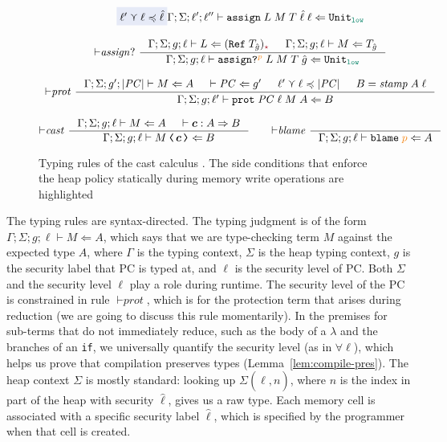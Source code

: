 \begin{figure}[tbp]
{\begin{gather*}
{               \highlightblue{\ell' \curlyvee \ell \preccurlyeq \hat{\ell}} }
              {\Gamma; \Sigma; \ell'; \ell'' \vdash \ccassign{L}{M}{T}{\hat{\ell}}{\ell} \Leftarrow \Unit_{\low}}
    \\[2ex]
    {\vdash}\mathit{assign?} ~
    \inference{\Gamma; \Sigma; g; \ell \vdash L \Leftarrow (\Refer{T_{\hat{g}}})_{\unk} &
               \Gamma; \Sigma; g; \ell \vdash M \Leftarrow T_{\hat{g}}}
              {\Gamma; \Sigma; g; \ell \vdash \ccassignproj{L}{M}{T}{\hat{g}}{p} \Leftarrow \Unit_{\low}}
    \\[2ex]
    {\vdash}\mathit{prot} ~
    \inference{\Gamma; \Sigma; g'; | \PC | \vdash M \Leftarrow A &
               \vdash \PC \Leftarrow g' &
               \ell' \curlyvee \ell \preccurlyeq | \PC | &
               B = \mathit{stamp} \; A \; \ell}
              {\Gamma; \Sigma; g; \ell' \vdash \ccprot{\PC}{\ell}{M}{A} \Leftarrow B}
    \\[2ex]
    {\vdash}\mathit{cast} ~
    \inference{\Gamma; \Sigma; g; \ell \vdash M \Leftarrow A & \vdash \bm{c} : A \Rightarrow B}
              {\Gamma; \Sigma; g; \ell \vdash \cccast{M}{\bm{c}} \Leftarrow B}
    \qquad
    {\vdash}\mathit{blame} ~
    \inference{}
              {\Gamma; \Sigma; g; \ell \vdash \blame{p} \Leftarrow A}
  \end{gather*}}
  \caption{Typing rules of the cast calculus \CC. The side conditions that enforce the
  heap policy statically during memory write operations are highlighted}
  \label{fig:cc-typing-full}
\end{figure}

The typing rules are syntax-directed.  The typing judgment is of the
form $\Gamma ; \Sigma ; g ; \ell \vdash M \Leftarrow A$, which says
that we are type-checking \CC term $M$ against the expected type $A$,
where $\Gamma$ is the typing context, $\Sigma$ is the heap typing
context, $g$ is the security label that PC is typed at, and $\ell$ is
the security level of PC.  Both $\Sigma$ and the security level $\ell$
play a role during runtime.  The security level of the PC is constrained in
rule ${\vdash}\textit{prot}$, which is for the protection term that
arises during reduction (we are going to discuss this rule momentarily).
In the premises for sub-terms that do not immediately
reduce, such as the body of a $\lambda$ and the branches of an
\texttt{if}, we universally quantify the security level (as in
$\forall \ell$), which helps us prove that
compilation preserves types (Lemma~\ref{lem:compile-pres}).  The heap
context $\Sigma$ is mostly standard: looking up
$\Sigma(\hat{\ell}, n)$, where $n$ is the index in part of the heap
with security $\hat{\ell}$, gives us a raw type. Each memory cell is
associated with a specific security label $\hat{\ell}$, which is
specified by the programmer when that cell is
created.

